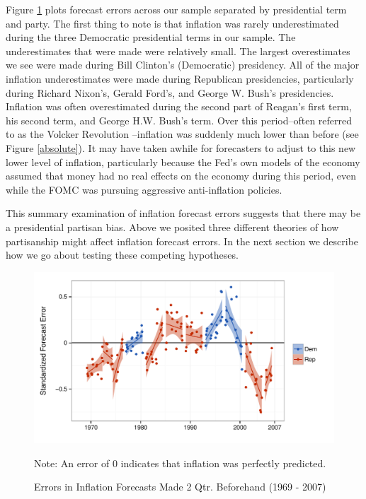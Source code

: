 \documentclass[a4paper]{article}\usepackage{graphicx, color}
\newenvironment{knitrout}{}{} %
\begin{document}
Figure \ref{errors_over_time} plots forecast errors across our sample separated by presidential term and party. The first thing to note is that inflation was rarely underestimated during the three Democratic presidential terms in our sample. The underestimates that were made were relatively small. The largest overestimates we see were made during Bill Clinton's (Democratic) presidency. All of the major inflation underestimates were made during Republican presidencies, particularly during Richard Nixon's, Gerald Ford's, and George W. Bush's presidencies. Inflation was often overestimated during the second part of Reagan's first term, his second term, and George H.W. Bush's term. Over this period--often referred to as the Volcker Revolution \citep{Bartels1985}--inflation was suddenly much lower than before (see Figure \ref{absolute}). It may have taken awhile for forecasters to adjust to this new lower level of inflation, particularly because the Fed's own models of the economy assumed that money had no real effects on the economy during this period, even while the FOMC was pursuing aggressive anti-inflation policies.

This summary examination of inflation forecast errors suggests that there may be a presidential partisan bias. Above we posited three different theories of how partisanship might affect inflation forecast errors. In the next section we describe how we go about testing these competing hypotheses.

\begin{figure}[t]
    \caption{Errors in Inflation Forecasts Made 2 Qtr. Beforehand (1969 - 2007)}
    \label{errors_over_time}
    \begin{center}
    
\begin{knitrout}
\color{fgcolor}

{\centering \includegraphics[width=0.8\linewidth]{figure/PartisanError} 

}



\end{knitrout}

    
    \end{center}
    \begin{singlespace}
        {\scriptsize{Note: An error of 0 indicates that inflation was perfectly predicted.}}
    \end{singlespace}
\end{figure}
\end{document}
